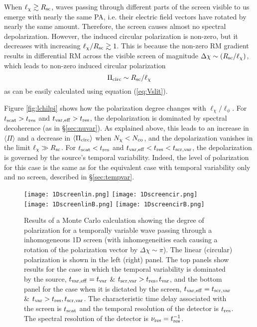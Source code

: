 \documentclass[fleqn,usenatbib]{mnras}
\begin{document}
	When $\ell_{\chi} \gtrsim R_{\rm sc}$, waves passing through different parts of the screen visible to us emerge with nearly the same PA, i.e. their electric field vectors have rotated by nearly the same amount. Therefore, the screen causes almost no spectral depolarization. However, the induced circular polarization is non-zero, but it decreases with increasing $\ell_{\chi}/R_{\rm sc}\gtrsim 1$. This is because the non-zero RM gradient results in differential RM across the visible screen of magnitude $\Delta\chi\sim (R_{\rm sc}/\ell_{\chi})$, which leads to non-zero induced circular polarization
	\begin{equation}
		\Pi_{\rm circ} \sim R_{\rm sc}/\ell_{\chi} 
	\end{equation}
	as can be easily calculated using equation (\ref{eq:Vslit}).
	
	Figure \ref{fig:lchilpi} shows how the polarization degree changes with $\ell_{\chi}/\ell_{\phi}$. For $t_{\rm scat}>t_{\rm res}$ and $t_{\rm var, eff}>t_{\rm res}$, the depolarization is dominated by spectral decoherence (as in \S \ref{sec:nuvar}). As explained above, this leads to an increase in $\langle \Pi \rangle$ and a decrease in $\langle \Pi_{\rm circ} \rangle$ when $N_{\chi}<N_{\rm co}$, and the depolarization vanishes in the limit $\ell_{\chi}\gg R_{\rm sc}$. For $t_{\rm scat}<t_{\rm res}$ and $t_{\rm var, eff}<t_{\rm res}<t_{\rm scr,var}$, the depolarization is governed by the source's temporal variability. Indeed, the level of polarization for this case is the same as for the equivalent case with temporal variability only and no screen, described in \S \ref{sec:tempvar}.
	
	
	\begin{figure*}
		\centering
		\texttt{[image: 1Dscreenlin.png]}
		\texttt{[image: 1Dscreencir.png]}\\
		\texttt{[image: 1DscreenlinB.png]}
		\texttt{[image: 1DscreencirB.png]}
		\caption{Results of a Monte Carlo calculation showing the degree of polarization for a temporally variable wave passing through a inhomogeneous 1D screen (with inhomegeneities each causing a rotation of the polarization vector by $\Delta \chi \sim \pi$). The linear (circular) polarization is shown in the left (right) panel. The top panels show results for the case in which the temporal variability is dominated by the source, $t_{\rm var,eff}=t_{\rm var}$ \& $t_{\rm scr,var}>t_{\rm res},t_{\rm var}$, and the bottom panel for the case when it is dictated by the screen, $t_{\rm var,eff}=t_{\rm scr,var}$ \& $t_{\rm var}>t_{\rm res},t_{\rm scr,var}$. The characteristic time delay associated with the screen is $t_{\rm scat}$ and the temporal resolution of the detector is $t_{\rm res}$. The spectral resolution of the detector is $\nu_{\rm res}=t_{\rm res}^{-1}$. }
		\label{fig:1D}
	\end{figure*}
	
\end{document}
